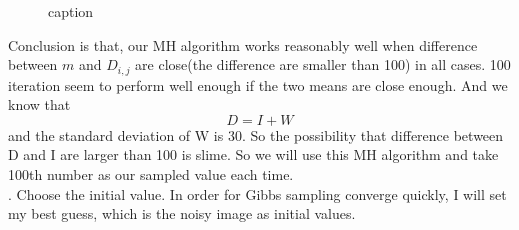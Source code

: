 \documentclass[11pt]{scrartcl}
\begin{document}
\begin{figure}
{}
\caption{caption}
\end{figure}

Conclusion is that, our MH algorithm works reasonably well when difference between $m$ and $D_{i,j}$ are close(the difference are smaller than 100) in all cases. 100 iteration seem to perform well enough if the two means are close enough. And we know that
$$D=I+W$$
and the standard deviation of W is 30. So the possibility that difference between D and I are larger than 100 is slime. So we will use this MH algorithm and take 100th number as our sampled value each time.\\

. Choose the initial value. In order for Gibbs sampling converge quickly, I will set my best guess, which is the noisy image as initial values.\\

\bigskip
\end{document}

